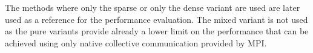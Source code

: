 The methods where only the sparse or only the dense variant are used are later used as a reference for the performance evaluation. The mixed variant is not used as the pure variants provide already a lower limit on the performance that can be achieved using only native collective communication provided by MPI.





